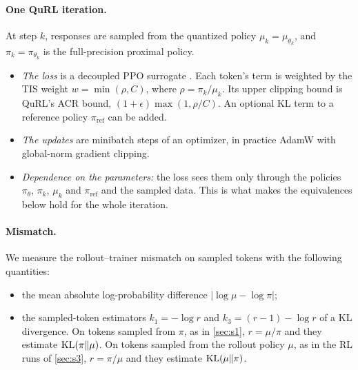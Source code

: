 \paragraph{One QuRL iteration.} At step $k$, responses are sampled from the quantized policy $\mu_k=\mu_{\theta_k}$, and $\pi_k=\pi_{\theta_k}$ is the full-precision proximal policy.
\begin{itemize}[leftmargin=*,itemsep=1pt]
\item \emph{The loss} is a decoupled PPO surrogate \citep{schulman2017ppo,hilton2022batch}. Each token's term is weighted by the TIS weight $w=\min(\rho,C)$, where $\rho=\pi_k/\mu_k$. Its upper clipping bound is QuRL's ACR bound, $(1+\epsilon)\max(1,\rho/C)$. An optional KL term to a reference policy $\pi_{\mathrm{ref}}$ can be added.
\item \emph{The updates} are minibatch steps of an optimizer, in practice AdamW \citep{kingma2015adam,loshchilov2019adamw} with global-norm gradient clipping.
\item \emph{Dependence on the parameters:} the loss sees them only through the policies $\pi_\theta$, $\pi_k$, $\mu_k$ and $\pi_{\mathrm{ref}}$ and the sampled data. This is what makes the equivalences below hold for the whole iteration.
\end{itemize}

\paragraph{Mismatch.} We measure the rollout--trainer mismatch on sampled tokens with the following quantities:
\begin{itemize}[leftmargin=*,itemsep=1pt]
\item the mean absolute log-probability difference $|\log\mu-\log\pi|$;
\item the sampled-token estimators $k_1=-\log r$ and $k_3=(r-1)-\log r$ of a KL divergence. On tokens sampled from $\pi$, as in \cref{sec:s1}, $r=\mu/\pi$ and they estimate $\mathrm{KL}(\pi\|\mu)$. On tokens sampled from the rollout policy $\mu$, as in the RL runs of \cref{sec:s3}, $r=\pi/\mu$ and they estimate $\mathrm{KL}(\mu\|\pi)$.
\end{itemize}
